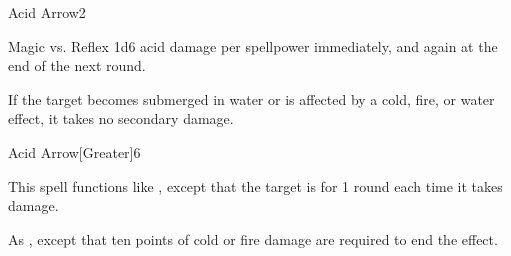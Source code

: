 \begin{spellsection}{Acid Arrow}{2}
    \begin{spellheader}
    \end{spellheader}
    \begin{spellcontent}
        \begin{spelltargetinginfo}
        \end{spelltargetinginfo}
        \begin{spelleffects}
            \begin{spellattack}{Magic vs. Reflex}
                \spellsuccess 1d6 acid damage per spellpower immediately, and again at the end of the next round.
            \end{spellattack}
        \end{spelleffects}
    \end{spellcontent}
    \begin{spellfooter}
        \spellnotes If the target becomes submerged in water or is affected by a cold, fire, or water effect, it takes no secondary damage.

        \physicalspellnotes
        \miscastrandom
    \end{spellfooter}
\end{spellsection}

\begin{spellsection}{Acid Arrow}[Greater]{6}
    \begin{spellheader}
    \end{spellheader}
    \begin{spellcontent}
        \begin{spelleffects}
            \spellspecial This spell functions like , except that the target is \staggered for 1 round each time it takes damage.
        \end{spelleffects}
    \end{spellcontent}
    \begin{spellfooter}
        \spellnotes As , except that ten points of cold or fire damage are required to end the effect.
        \miscastrandom
    \end{spellfooter}
\end{spellsection}

